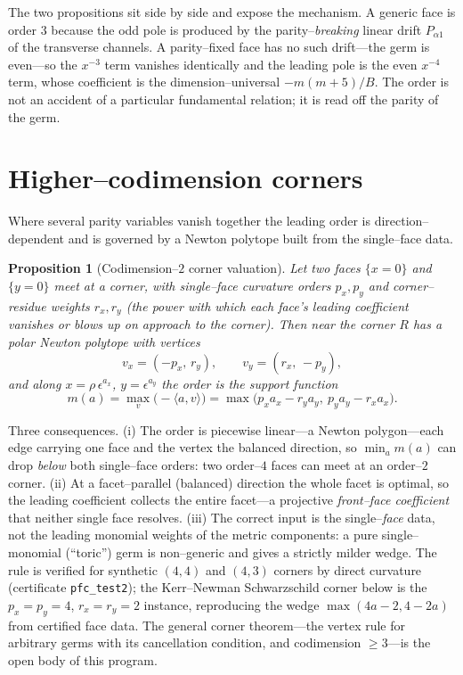 \documentclass[11pt]{article}
\newtheorem{proposition}[theorem]{Proposition}
\begin{document}
The two propositions sit side by side and expose the mechanism. A generic face is order $3$
because the odd pole is produced by the parity--\emph{breaking} linear drift $P_{\alpha1}$ of
the transverse channels. A parity--fixed face has no such drift---the germ is even---so the
$x^{-3}$ term vanishes identically and the leading pole is the even $x^{-4}$ term, whose
coefficient is the dimension--universal $-m(m+5)/B$. The order is not an accident of a
particular fundamental relation; it is read off the parity of the germ.

\section{Higher--codimension corners}
\label{sec:corner}

Where several parity variables vanish together the leading order is direction--dependent and is
governed by a Newton polytope built from the single--face data.

\begin{proposition}[Codimension--$2$ corner valuation]
\label{prop:corner}
Let two faces $\{x=0\}$ and $\{y=0\}$ meet at a corner, with single--face curvature orders
$p_x,p_y$ and corner--residue weights $r_x,r_y$ (the power with which each face's leading
coefficient vanishes or blows up on approach to the corner). Then near the corner $R$ has a
polar Newton polytope with vertices
\[
v_x=(-p_x,\,r_y),\qquad v_y=(r_x,\,-p_y),
\]
and along $x=\rho\,\epsilon^{a_x}$, $y=\epsilon^{a_y}$ the order is the support function
\[
m(a)=\max_{v}\bigl(-\langle a,v\rangle\bigr)=\max\bigl(p_x a_x-r_y a_y,\ p_y a_y-r_x a_x\bigr).
\]
\end{proposition}

Three consequences. (i) The order is piecewise linear---a Newton polygon---each edge carrying
one face and the vertex the balanced direction, so $\min_a m(a)$ can drop \emph{below} both
single--face orders: two order--$4$ faces can meet at an order--$2$ corner. (ii) At a
facet--parallel (balanced) direction the whole facet is optimal, so the leading coefficient
collects the entire facet---a projective \emph{front--face coefficient} that neither single face
resolves. (iii) The correct input is the single--\emph{face} data, not the leading monomial
weights of the metric components: a pure single--monomial (``toric'') germ is non--generic and
gives a strictly milder wedge. The rule is verified for synthetic $(4,4)$ and $(4,3)$ corners by
direct curvature (certificate \texttt{pfc\_test2}); the Kerr--Newman Schwarzschild corner below
is the $p_x{=}p_y{=}4$, $r_x{=}r_y{=}2$ instance, reproducing the wedge $\max(4a-2,4-2a)$ from
certified face data. The general corner theorem---the vertex rule for arbitrary germs with its
cancellation condition, and codimension $\ge3$---is the open body of this program.
\end{document}
